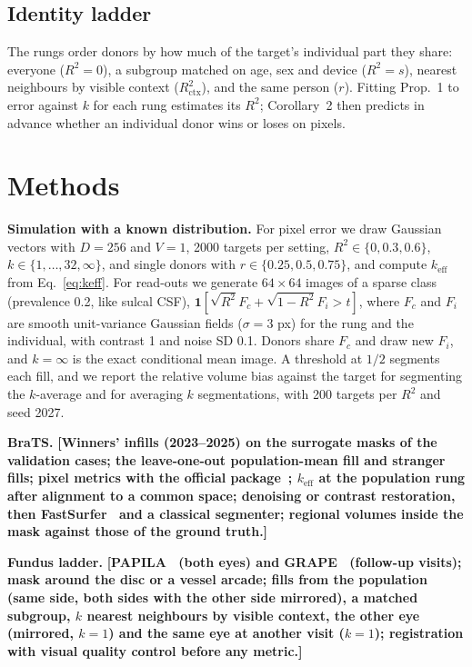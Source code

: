 \documentclass{article}
\newcommand{\todo}[1]{\textbf{[#1]}}
\begin{document}
\subsection{Identity ladder}
The rungs order donors by how much of the target's individual part they share: everyone ($R^2=0$), a subgroup matched on age, sex and device ($R^2=s$), nearest neighbours by visible context ($R^2_{\mathrm{ctx}}$), and the same person ($r$).
Fitting Prop.~1 to error against $k$ for each rung estimates its $R^2$; Corollary~2 then predicts in advance whether an individual donor wins or loses on pixels.

\section{Methods}
\label{sec:methods}
\textbf{Simulation with a known distribution.}
For pixel error we draw Gaussian vectors with $D=256$ and $V=1$, 2000 targets per setting, $R^2\in\{0,0.3,0.6\}$, $k\in\{1,\dots,32,\infty\}$, and single donors with $r\in\{0.25,0.5,0.75\}$, and compute $k_{\mathrm{eff}}$ from Eq.~\ref{eq:keff}.
For read-outs we generate $64\times64$ images of a sparse class (prevalence 0.2, like sulcal CSF), $\mathbf{1}[\sqrt{R^2}F_c+\sqrt{1-R^2}F_i>t]$, where $F_c$ and $F_i$ are smooth unit-variance Gaussian fields ($\sigma=3$ px) for the rung and the individual, with contrast 1 and noise SD 0.1.
Donors share $F_c$ and draw new $F_i$, and $k=\infty$ is the exact conditional mean image.
A threshold at $1/2$ segments each fill, and we report the relative volume bias against the target for segmenting the $k$-average and for averaging $k$ segmentations, with 200 targets per $R^2$ and seed 2027.

\textbf{BraTS.}
\todo{Winners' infills (2023--2025) on the surrogate masks of the validation cases; the leave-one-out population-mean fill and stranger fills; pixel metrics with the official package~\cite{inpainting2026}; $k_{\mathrm{eff}}$ at the population rung after alignment to a common space; denoising or contrast restoration, then FastSurfer~\cite{henschel2020} and a classical segmenter; regional volumes inside the mask against those of the ground truth.}

\textbf{Fundus ladder.}
\todo{PAPILA~\cite{kovalyk2022papila} (both eyes) and GRAPE~\cite{huang2023grape} (follow-up visits); mask around the disc or a vessel arcade; fills from the population (same side, both sides with the other side mirrored), a matched subgroup, $k$ nearest neighbours by visible context, the other eye (mirrored, $k=1$) and the same eye at another visit ($k=1$); registration with visual quality control before any metric.}
\end{document}
